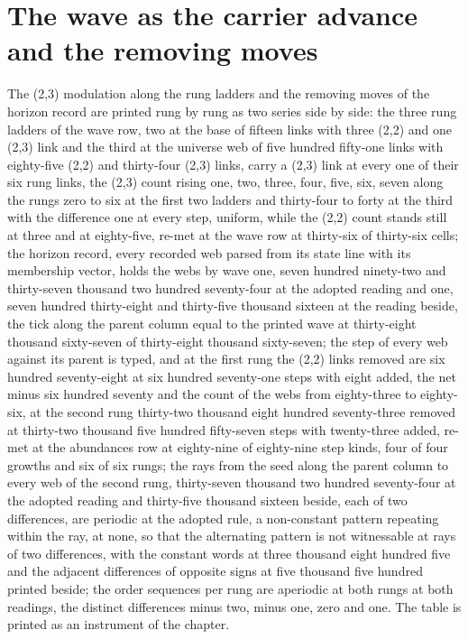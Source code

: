 \section{The wave as the carrier advance and the removing moves}\label{mod:IV-3-D543954-the-wave-as-the-carrier-advance-and-the-removing-moves}
\begin{chtable}\label{box:IV-3-D543954-the-wave-as-the-carrier-advance-and-the-removing-moves:1}
The (2,3) modulation along the rung ladders and the removing moves of the horizon record are printed rung by rung as two series side by side: the three rung ladders of the wave row, two at the base of fifteen links with three (2,2) and one (2,3) link and the third at the universe web of five hundred fifty-one links with eighty-five (2,2) and thirty-four (2,3) links, carry a (2,3) link at every one of their six rung links, the (2,3) count rising one, two, three, four, five, six, seven along the rungs zero to six at the first two ladders and thirty-four to forty at the third with the difference one at every step, uniform, while the (2,2) count stands still at three and at eighty-five, re-met at the wave row at thirty-six of thirty-six cells; the horizon record, every recorded web parsed from its state line with its membership vector, holds the webs by wave one, seven hundred ninety-two and thirty-seven thousand two hundred seventy-four at the adopted reading and one, seven hundred thirty-eight and thirty-five thousand sixteen at the reading beside, the tick along the parent column equal to the printed wave at thirty-eight thousand sixty-seven of thirty-eight thousand sixty-seven; the step of every web against its parent is typed, and at the first rung the (2,2) links removed are six hundred seventy-eight at six hundred seventy-one steps with eight added, the net minus six hundred seventy and the count of the webs from eighty-three to eighty-six, at the second rung thirty-two thousand eight hundred seventy-three removed at thirty-two thousand five hundred fifty-seven steps with twenty-three added, re-met at the abundances row at eighty-nine of eighty-nine step kinds, four of four growths and six of six rungs; the rays from the seed along the parent column to every web of the second rung, thirty-seven thousand two hundred seventy-four at the adopted reading and thirty-five thousand sixteen beside, each of two differences, are periodic at the adopted rule, a non-constant pattern repeating within the ray, at none, so that the alternating pattern is not witnessable at rays of two differences, with the constant words at three thousand eight hundred five and the adjacent differences of opposite signs at five thousand five hundred printed beside; the order sequences per rung are aperiodic at both rungs at both readings, the distinct differences minus two, minus one, zero and one. The table is printed as an instrument of the chapter.
\end{chtable}
